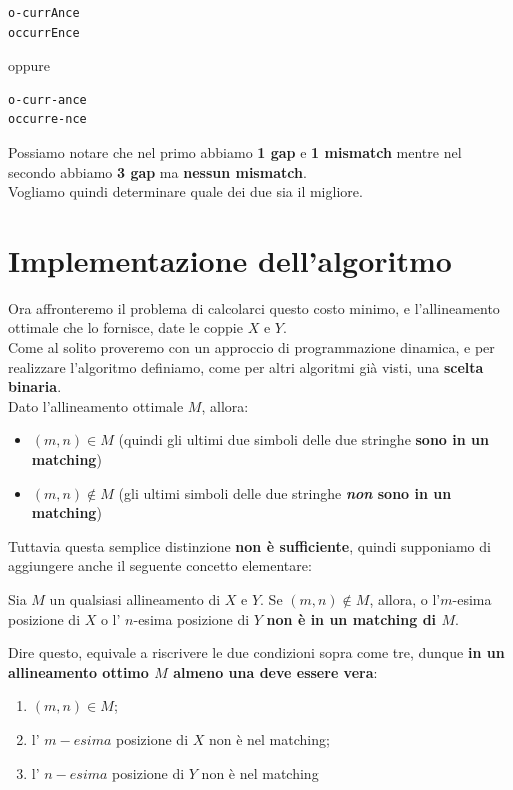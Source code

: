 \begin{verbatim}
o-currAnce
occurrEnce
\end{verbatim}

oppure

\begin{verbatim}
o-curr-ance
occurre-nce
\end{verbatim}

Possiamo notare che nel primo abbiamo \textbf{1 gap} e \textbf{1
	mismatch} mentre nel secondo abbiamo \textbf{3 gap} ma \textbf{nessun
	mismatch}.\\
Vogliamo quindi determinare quale dei due sia il migliore.

\section{Implementazione dell'algoritmo}

Ora affronteremo il problema di calcolarci questo costo minimo, e
l'allineamento ottimale che lo fornisce, date le coppie $X$ e $Y$.\\
Come al solito proveremo con un approccio di programmazione dinamica, e
per realizzare l'algoritmo definiamo, come per altri algoritmi già
visti, una \textbf{scelta binaria}.\\ Dato l'allineamento ottimale $M$,
allora:
\begin{itemize}
	\item $(m,n) \in M$ (quindi gli ultimi due simboli delle due
	      stringhe \textbf{sono in un matching})
	\item $(m,n) \notin M$ (gli ultimi
	      simboli delle due stringhe \textbf{\emph{non} sono in un matching})
\end{itemize}

Tuttavia questa semplice distinzione \textbf{non è sufficiente}, quindi
supponiamo di aggiungere anche il seguente concetto elementare:
\begin{myblockquote}
	Sia $M$ un qualsiasi allineamento di $X$ e $Y$. Se $(m,n) \notin M$, allora,
	o l'$m$-esima posizione di $X$ o l' $n$-esima posizione di $Y$ \textbf{non è
		in un matching di $M$}.
\end{myblockquote}

Dire questo, equivale a riscrivere le due condizioni sopra come tre,
dunque \textbf{in un allineamento ottimo $M$ almeno una deve essere
	vera}:
\begin{enumerate}
	\item $(m,n) \in M$;
	\item l' $m-esima$ posizione di $X$ non è nel matching;
	\item l' $n-esima$ posizione di $Y$ non è nel matching
\end{enumerate}


